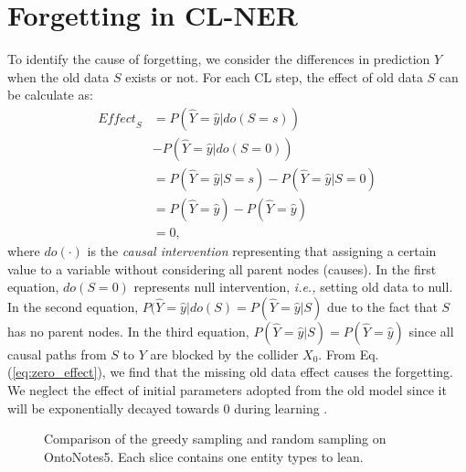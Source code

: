 \documentclass[11pt]{article}
\begin{document}
\section{Forgetting in CL-NER}
\label{appendix:forgetting}
To identify the cause of forgetting, we consider the differences in prediction $Y$ when the old data $S$ exists or not.
For each CL step, the effect of old data $S$ can be calculate as:
\begin{align}
    \textit{Effect}_{S} & = P(\hat{Y}=\hat{y}|\textit{do}(S=s)) \\
   \nonumber&- P(\hat{Y}=\hat{y}|\textit{do}(S=0)) \\
   &= P(\hat{Y}=\hat{y}|S=s) - P(\hat{Y}=\hat{y}|S=0) \\
   &= P(\hat{Y}=\hat{y}) - P(\hat{Y}=\hat{y}) \\
   &= 0,
   \label{eq:zero_effect}
\end{align}
where $\textit{do}(\cdot)$ is the \textit{causal intervention} \citep{pearl2014interpretation,pearl2009causality} representing that assigning a certain value to a variable without considering all parent nodes (causes).
In the first equation, $\textit{do}(S=0)$ represents null intervention, \textit{i.e.,} setting old data to null.
In the second equation, $P(\hat{Y}=\hat{y}|\textit{do}(S)=P(\hat{Y}=\hat{y}|S)$ due to the fact that $S$ has no parent nodes.
In the third equation, $P(\hat{Y}=\hat{y}|S)=P(\hat{Y}=\hat{y})$ since all causal paths from $S$ to $Y$ are blocked by the collider $X_0$.
From Eq.(\ref{eq:zero_effect}), we find that the missing old data effect causes the forgetting.
We neglect the effect of initial parameters adopted from the old model since it will be exponentially decayed towards 0 during learning \citep{kirkpatrick2017overcoming}.

\begin{figure*}[t]
    \centering
    \caption{Comparison of the greedy sampling and random sampling on OntoNotes5. Each slice contains one entity types to lean.}
    \label{fig:label_distri}
\end{figure*}

\end{document}

